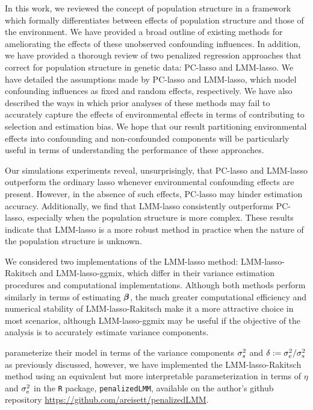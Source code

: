 In this work, we reviewed the concept of population structure in a framework which formally differentiates between effects of population structure and those of the environment. We have provided a broad outline of existing  methods for ameliorating the effects of these unobserved confounding influences. In addition, we have provided a thorough review of two penalized regression approaches that correct for population structure in genetic data: PC-lasso and LMM-lasso. We have detailed the assumptions made by PC-lasso and LMM-lasso, which model confounding influences as fixed and random effects, respectively. We have also described the ways in which prior analyses of these methods may fail to accurately capture the effects of environmental effects in terms of contributing to selection and estimation bias. We hope that our result partitioning environmental effects into confounding and non-confounded components will be particularly useful in terms of understanding the performance of these approaches.

Our simulations experiments reveal, unsurprisingly, that PC-lasso and LMM-lasso outperform the ordinary lasso whenever environmental confounding effects are present. However, in the absence of such effects, PC-lasso may hinder estimation accuracy. Additionally, we find that LMM-lasso consistently outperforms PC-lasso, especially when the population structure is more complex. These results indicate that LMM-lasso is a more robust method in practice when the nature of the population structure is unknown.

We considered two implementations of the LMM-lasso method: LMM-lasso-Rakitsch and LMM-lasso-ggmix, which differ in their variance estimation procedures and computational implementations. Although both methods perform similarly in terms of estimating $\boldsymbol{\beta}{}$, the much greater computational efficiency and numerical stability of LMM-lasso-Rakitsch make it a more attractive choice in most scenarios, although LMM-lasso-ggmix may be useful if the objective of the analysis is to accurately estimate variance components.

\citet{Rakitsch2012} parameterize their model in terms of the variance components $\sigma^2_s$ and $\delta := \sigma^2_e / \sigma^2_s$ as previously discussed, however, we have implemented the LMM-lasso-Rakitsch method using an equivalent but more interpretable parameterization in terms of $\eta$ and $\sigma^2_e$ in the \texttt{R} package, \texttt{penalizedLMM}, available on the author's github repository \url{https://github.com/areisett/penalizedLMM}.

